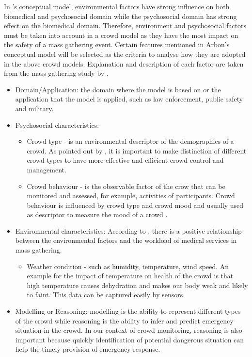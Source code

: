 In \citet{Arbon2004}’s conceptual model, environmental factors have strong influence on both biomedical and psychosocial domain while the psychosocial domain has strong effect on the biomedical domain. Therefore, environment and psychosocial factors must be taken into account in a crowd model as they have the most impact on the safety of a mass gathering event. Certain features mentioned in Arbon’s conceptual model will be selected as the criteria to analyse how they are adopted in the above crowd models. Explanation and description of each factor are taken from the mass gathering study by \citet{Zeitz2009}.
\begin{itemize}
	\item Domain/Application: the domain where the model is based on or the application that the model is applied, such as law enforcement, public safety and military.
	\item Psychosocial characteristics:
	\begin{itemize}
		\item Crowd type - is an environmental descriptor of the demographics of a crowd. As pointed out by \citet{Berlonghi1995}, it is important to make distinction of different crowd types to have more effective and efficient crowd control and management.
		\item Crowd behaviour - is the observable factor of the crow that can be monitored and assessed, for example, activities of participants. Crowd behaviour is influenced by crowd type and crowd mood and usually used as descriptor to measure the mood of a crowd \citep{Zeitz2009}.
	\end{itemize}
	\item Environmental characteristics: According to \citet{Arbon2001}, there is a positive relationship between the environmental factors and the workload of medical services in mass gathering.
	\begin{itemize}	
		\item Weather condition - such as humidity, temperature, wind speed. An example for the impact of temperature on health of the crowd is that high temperature causes dehydration and makes our body weak and likely to faint. This data can be captured easily by sensors.
	\end{itemize}
	\item Modelling or Reasoning: modelling is the ability to represent different types of the crowd while reasoning is the ability to infer and predict emergency situation in the crowd. In our context of crowd monitoring, reasoning is also important because quickly identification of potential dangerous situation can help the timely provision of emergency response.
\end{itemize}

